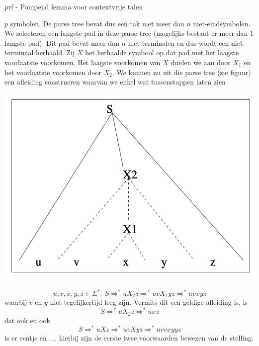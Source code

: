 \begin{prf}{prf - Pompend lemma voor contextvrije talen}
    \begin{minipage}{.7\textwidth}
        $p$ symbolen. De parse tree bevat dus een tak met meer dan $n$ niet-eindsymbolen. We selecteren een langste pad in deze parse tree (mogelijks bestaat er meer dan 1 langste pad). Dit pad bevat meer dan $n$ niet-terminalen en dus wordt een niet-terminaal herhaald. Zij $X$ het herhaalde symbool op dat pad met het laagste voorlaatste voorkomen. Het laagste voorkomen van $X$ duiden we aan door $X_1$ en het voorlaatste voorkomen door $X_2$.  We kunnen nu uit die parse tree (zie figuur) een afleiding construeren waarvan we enkel wat tussenstappen laten zien
    \end{minipage}
    \begin{minipage}{.26\textwidth}
        \begin{center}
            \includegraphics[scale = 0.35]{Images/ParseTree225.png}
        \end{center}
    \end{minipage}
    \begin{equation*}
        u,v,x,y,z \in \Sigma^*: \ S \Rightarrow^* uX_{2}z \Rightarrow^* uvX_{1}yz \Rightarrow^* uvxyz
    \end{equation*}
    waarbij $v$ en $y$ niet tegelijkertijd leeg zijn. Vermits dit een geldige afleiding is, is 
    \begin{equation*}
        S \Rightarrow^* uX_{2}z \Rightarrow^* uxz
    \end{equation*}
    dat ook en ook 
    \begin{equation*}
        S \Rightarrow^* uXz \Rightarrow^* uvXyz  \Rightarrow^* uvvxyyz
    \end{equation*}
    is er eentje en $\ldots$, hierbij zijn de eerste twee voorwaarden bewezen van de stelling. \\


\end{prf}
